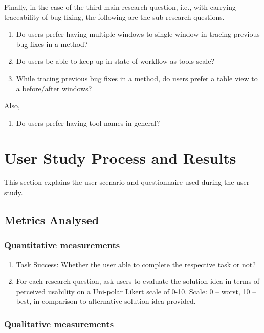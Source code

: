 Finally, in the case of the third main research question, i.e., with carrying traceability of bug fixing, the following are the sub research questions. \\

\begin{enumerate}
\item Do users prefer having multiple windows to single window in tracing previous bug fixes in a method?
\item Do users be able to keep up in state of workflow as tools scale?
\item While tracing previous bug fixes in a method, do users prefer a table view to a before/after windows?
\end{enumerate}

Also,
\begin{enumerate}
\item Do users prefer having tool names in general?
\end{enumerate}

\section{User Study Process and Results}

This section explains the user scenario and questionnaire used during the user study.

\subsection{Metrics Analysed}

\subsubsection{Quantitative measurements}  

\begin{enumerate}
	\item Task Success: Whether the user able to complete the respective task or not?
	\item For each research question, ask users to evaluate the solution idea in terms of perceived usability on a Uni-polar Likert scale of 0-10. Scale: 0 – worst, 10 – best, in comparison to alternative solution idea provided.
\end{enumerate} 

\subsubsection{Qualitative measurements} 

